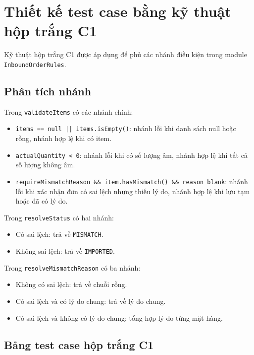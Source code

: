 \documentclass[12pt,a4paper]{article}
\begin{document}
\section{Thiết kế test case bằng kỹ thuật hộp trắng C1}

Kỹ thuật hộp trắng C1 được áp dụng để phủ các nhánh điều kiện trong module \texttt{InboundOrderRules}.

\subsection{Phân tích nhánh}

Trong \texttt{validateItems} có các nhánh chính:

\begin{itemize}[leftmargin=1.2cm]
    \item \texttt{items == null || items.isEmpty()}: nhánh lỗi khi danh sách null hoặc rỗng, nhánh hợp lệ khi có item.
    \item \texttt{actualQuantity < 0}: nhánh lỗi khi có số lượng âm, nhánh hợp lệ khi tất cả số lượng không âm.
    \item \texttt{requireMismatchReason \&\& item.hasMismatch() \&\& reason blank}: nhánh lỗi khi xác nhận đơn có sai lệch nhưng thiếu lý do, nhánh hợp lệ khi lưu tạm hoặc đã có lý do.
\end{itemize}

Trong \texttt{resolveStatus} có hai nhánh:

\begin{itemize}[leftmargin=1.2cm]
    \item Có sai lệch: trả về \texttt{MISMATCH}.
    \item Không sai lệch: trả về \texttt{IMPORTED}.
\end{itemize}

Trong \texttt{resolveMismatchReason} có ba nhánh:

\begin{itemize}[leftmargin=1.2cm]
    \item Không có sai lệch: trả về chuỗi rỗng.
    \item Có sai lệch và có lý do chung: trả về lý do chung.
    \item Có sai lệch và không có lý do chung: tổng hợp lý do từng mặt hàng.
\end{itemize}

\subsection{Bảng test case hộp trắng C1}
\end{document}
